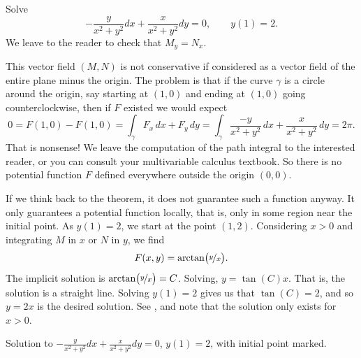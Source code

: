 \begin{example}
Solve
\begin{equation*}
-\frac{y}{x^2+y^2} dx + \frac{x}{x^2+y^2} dy = 0 , \qquad y(1) = 2.
\end{equation*}
We leave to the reader to check that
$M_y = N_x$.

This vector field $(M,N)$ is not conservative if considered as a vector
field of the entire plane minus the origin.  The problem is that if the curve $\gamma$
is a circle around the origin, say starting at $(1,0)$ and
ending at $(1,0)$ going counterclockwise, then if $F$ existed we would expect
\begin{equation*}
0 = F(1,0) - F(1,0) = \int_\gamma F_x \, dx + F_y \, dy = \int_\gamma \frac{-y}{x^2+y^2} \, dx +
\frac{x}{x^2+y^2} \, dy = 2\pi .
\end{equation*}
That is nonsense!
We leave the computation of the path integral to the interested reader, or
you can consult your multivariable calculus textbook.  So there is no
potential function $F$ defined everywhere outside the origin $(0,0)$.

If we think back to the theorem, it does not guarantee such a function
anyway.  It only guarantees a potential function locally, that is, only in
some region near the initial point.  As $y(1) = 2$,
we start at the point $(1,2)$.  Considering $x > 0$ and
integrating $M$ in $x$ or $N$ in $y$, we find
\begin{equation*}
F(x,y) = \operatorname{arctan} \bigl( \nicefrac{y}{x} \bigr) .
\end{equation*}
The implicit solution is 
$\operatorname{arctan} \bigl( \nicefrac{y}{x} \bigr) = C$.  Solving,
$y = \tan(C) x$.  That is, the solution is a straight line.  Solving $y(1) =
2$ gives us that $\tan(C) = 2$, and so $y= 2x$ is the desired solution.
See , and note that the solution only exists for $x >
0$.
\begin{myfig}
\capstart
{}
\caption{Solution to 
$-\frac{y}{x^2+y^2} dx + \frac{x}{x^2+y^2} dy = 0$, $y(1) = 2$,
with initial point marked.\label{exact:y2x}}
\end{myfig}
\end{example}

